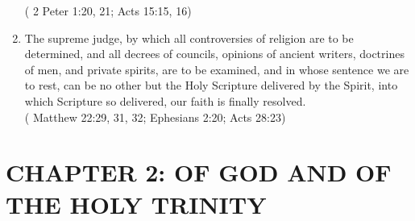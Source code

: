 \documentclass[12pt,a4paper]{book}
\begin{document}
\begin{enumerate}
( 2 Peter 1:20, 21; Acts 15:15, 16)
\item The supreme judge, by which all controversies of religion are to be determined, and all decrees of councils, opinions of ancient writers, doctrines of men, and private spirits, are to be examined, and in whose sentence we are to rest, can be no other but the Holy Scripture delivered by the Spirit, into which Scripture so delivered, our faith is finally resolved.\\
( Matthew 22:29, 31, 32; Ephesians 2:20; Acts 28:23)
\end{enumerate}

\chapter{CHAPTER 2: OF GOD AND OF THE HOLY TRINITY}
\label{ch-God}
\end{document}
